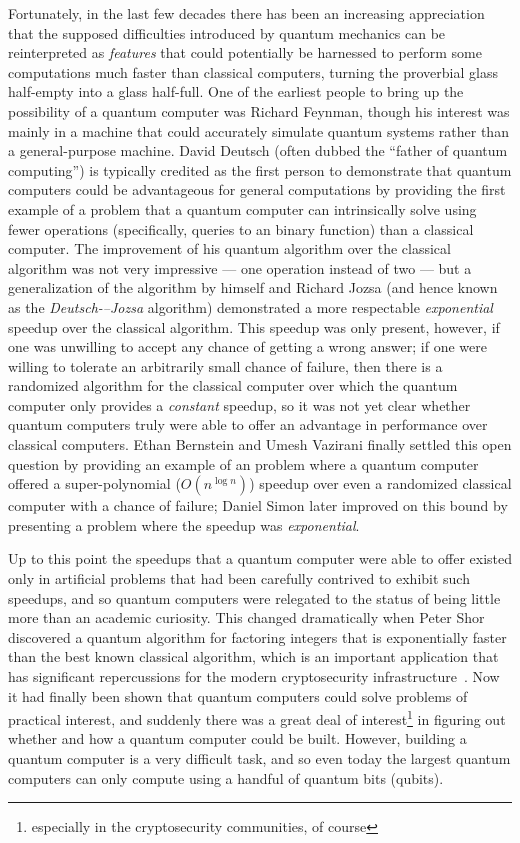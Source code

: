 \documentclass[12pt]{amsbook}
\theoremstyle{plain}
\theoremstyle{definition}
\theoremstyle{remark}
\begin{document}
Fortunately, in the last few decades there has been an increasing appreciation that the supposed difficulties introduced by quantum mechanics can be reinterpreted as \emph{features} that could potentially be harnessed to perform some computations much faster than classical computers, turning the proverbial glass half-empty into a glass half-full.  One of the earliest people to bring up the possibility of a quantum computer was Richard Feynman, though his interest was mainly in a machine that could accurately simulate quantum systems rather than a general-purpose machine\cite{springerlink:10.1007/BF02650179}.  David Deutsch (often dubbed the ``father of quantum computing'') is typically credited as the first person to demonstrate that quantum computers could be advantageous for general computations by providing the first example of a problem that a quantum computer can intrinsically solve using fewer operations (specifically, queries to an binary function) than a classical computer\cite{Deutsch08071985}.  The improvement of his quantum algorithm over the classical algorithm was not very impressive --- one operation instead of two --- but a generalization of the algorithm by himself and Richard Jozsa (and hence known as the \emph{Deutsch-–Jozsa} algorithm) demonstrated a more respectable \emph{exponential} speedup over the classical algorithm\cite{Deutsch1992}.  This speedup was only present, however, if one was unwilling to accept any chance of getting a wrong answer;  if one were willing to tolerate an arbitrarily small chance of failure, then there is a randomized algorithm for the classical computer over which the quantum computer only provides a \emph{constant} speedup, so it was not yet clear whether quantum computers truly were able to offer an advantage in performance over classical computers.  Ethan Bernstein and Umesh Vazirani finally settled this open question by providing an example of an problem where a quantum computer offered a super-polynomial ($O(n^{\log n})$) speedup over even a randomized classical computer with a chance of failure\cite{Bernstein:1993:QCT:167088.167097};  Daniel Simon later improved on this bound by presenting a problem where the speedup was \emph{exponential}\cite{10.1109/SFCS.1994.365701}.

Up to this point the speedups that a quantum computer were able to offer existed only in artificial problems that had been carefully contrived to exhibit such speedups, and so quantum computers were relegated to the status of being little more than an academic curiosity.  This changed dramatically when Peter Shor discovered a quantum algorithm for factoring integers that is exponentially faster than the best known classical algorithm, which is an important application that has significant repercussions for the modern cryptosecurity infrastructure~\cite{Shor:94a}.  Now it had finally been shown that quantum computers could solve problems of practical interest, and suddenly there was a great deal of interest\footnote{especially in the cryptosecurity communities, of course} in figuring out whether and how a quantum computer could be built.  However, building a quantum computer is a very difficult task, and so even today the largest quantum computers can only compute using a handful of quantum bits (qubits).
\end{document}

